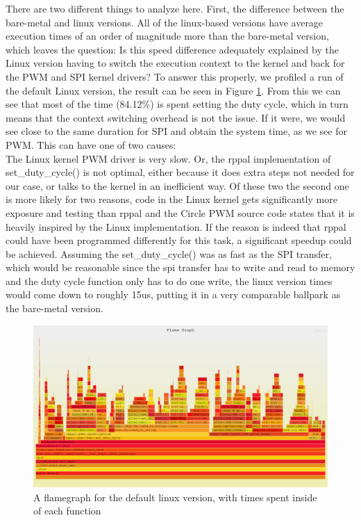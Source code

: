 There are two different things to analyze here.
First, the difference between the bare-metal and linux versions.
All of the linux-based versions have average execution times of an order of magnitude more than the bare-metal version,
which leaves the question:
Is this speed difference adequately explained by the Linux version having to switch the execution context to the kernel and back for the PWM and SPI kernel drivers?
To answer this properly, we profiled a run of the default Linux version, the result can be seen in Figure \ref{fig:experiments:flamegraph}.
From this we can see that most of the time (84.12\%) is spent setting the duty cycle, which in turn means that the context switching overhead is not the issue.
If it were, we would see close to the same duration for SPI and obtain the system time, as we see for PWM.
This can have one of two causes:\\
The Linux kernel PWM driver is very slow.
Or, the rppal implementation of set\_duty\_cycle() is not optimal,
either because it does extra steps not needed for our case,
or talks to the kernel in an inefficient way.
Of these two the second one is more likely for two reasons,
code in the Linux kernel gets significantly more exposure and testing than rppal and the Circle PWM source code states
that it is heavily inspired by the Linux implementation.
If the reason is indeed that rppal could have been programmed differently for this task,
a significant speedup could be achieved.
Assuming the set\_duty\_cycle() was as fast as the SPI transfer,
which would be reasonable since the spi transfer has to write and read to memory and the duty cycle function only has to do one write,
the linux version times would come down to roughly 15us,
putting it in a very comparable ballpark as the bare-metal version.

\begin{figure}[H]
  \begin{center}
    \includegraphics[width=\textwidth]{assets/os-default/flamegraph.png}
    \caption{A flamegraph for the default linux version, with times spent inside of each function}
    \label{fig:experiments:flamegraph}
  \end{center}
\end{figure}

